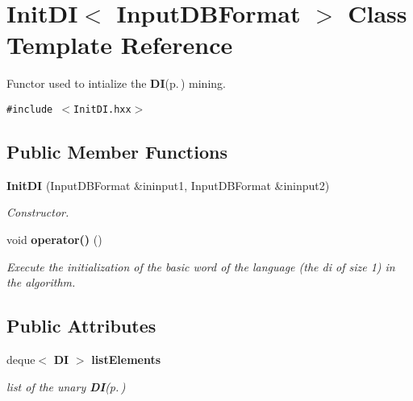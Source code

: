 \section{Init\-DI$<$ Input\-DBFormat $>$ Class Template Reference}
\label{class_init_d_i}
Functor used to intialize the {\bf DI}{\rm (p.\,\pageref{class_d_i})} mining.  


{\tt \#include $<$Init\-DI.hxx$>$}

\subsection*{Public Member Functions}
\begin{CompactItemize}
\item 
{\bf Init\-DI} (Input\-DBFormat \&ininput1, Input\-DBFormat \&ininput2)\label{class_init_d_i_5bc51589ec75152f94c3e36e00647deb}

\begin{CompactList}\small\item\em Constructor. \item\end{CompactList}\item 
void {\bf operator()} ()\label{class_init_d_i_c66569def35604e66f53c36d670a42fe}

\begin{CompactList}\small\item\em Execute the initialization of the basic word of the language (the di of size 1) in the algorithm. \item\end{CompactList}\end{CompactItemize}
\subsection*{Public Attributes}
\begin{CompactItemize}
\item 
deque$<$ {\bf DI} $>$ {\bf list\-Elements}\label{class_init_d_i_d0afa016cc4ee0da56d291ae1c35314a}

\begin{CompactList}\small\item\em list of the unary {\bf DI}{\rm (p.\,\pageref{class_d_i})} \item\end{CompactList}\end{CompactItemize}
